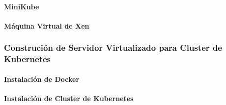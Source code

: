 \paragraph{MiniKube}
%
%

\paragraph{Máquina Virtual de Xen}
\subsubsection{Construción de Servidor Virtualizado para Cluster de Kubernetes}
\paragraph{Instalación de Docker}
\paragraph{Instalación de Cluster de Kubernetes}



